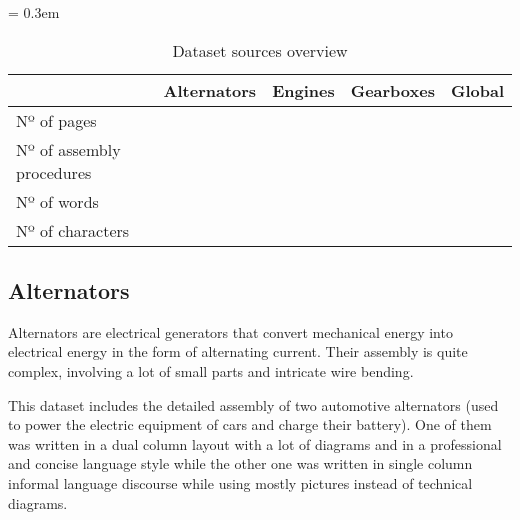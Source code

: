 \begin{table}[t]
	\caption{Dataset sources overview}
	\tabulinesep = 0.3em
	\setlength{\tabcolsep}{0.2em}
	\centering
	\begin{tabu} { X[3.0,l,m] X[1.2,r,m] X[r,m] X[1.2,r,m] X[r,m] }
		\rowfont{\bfseries\itshape} & Alternators													& Engines															& Gearboxes 														& Global 															\\
		\hline
		Nº of pages 				& 							& 					& 							& 						\\
		Nº of assembly procedures 	& 								& 						& 								& 							\\
		Nº of words					& 		& 		& 		& 		\\
		Nº of characters			& 	& 	& 	& 	\\
	\end{tabu}
	\label{tab:dataset-sources_dataset-overview}
\end{table}


\subsection{Alternators}

Alternators are electrical generators that convert mechanical energy into electrical energy in the form of alternating current. Their assembly is quite complex, involving a lot of small parts and intricate wire bending.

This dataset includes the detailed assembly of two automotive alternators (used to power the electric equipment of cars and charge their battery). One of them was written in a dual column layout with a lot of diagrams and in a professional and concise language style while the other one was written in single column informal language discourse while using mostly pictures instead of technical diagrams.


